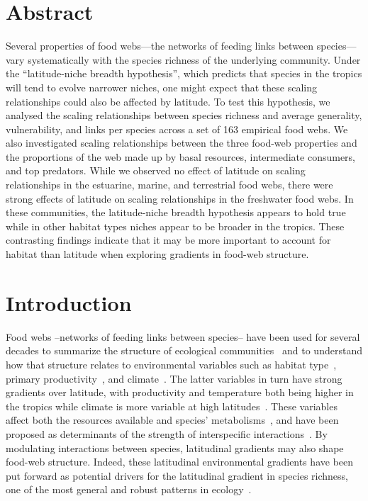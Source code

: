 \documentclass[12pt]{article}
\begin{document}
\begin{spacing}{1.0}
\section*{Abstract}

Several properties of food webs---the networks of feeding links between
species---vary systematically with the species richness of the underlying
community.  Under the ``latitude-niche breadth hypothesis'', which predicts
that species in the tropics will tend to evolve narrower niches, one might
expect that these scaling relationships could also be affected by latitude. To
test this hypothesis, we analysed the scaling relationships between species
richness and average generality, vulnerability, and links per species across a
set of 163 empirical food webs.  We also investigated scaling relationships
between the three food-web properties and the proportions of the web made up
by basal resources, intermediate consumers, and top predators. While we
observed no effect of latitude on scaling relationships in the estuarine,
marine, and terrestrial food webs, there were strong effects of latitude on
scaling relationships in the freshwater food webs. In these communities, the
latitude-niche breadth hypothesis appears to hold true while in other habitat
types niches appear to be broader in the tropics. These contrasting findings
indicate that it may be more important to account for habitat than latitude
when exploring gradients in food-web structure.


\section*{Introduction} 

  Food webs --networks of feeding links between species-- have been used for several decades to summarize the structure of 
  ecological communities~\citep{Petchey2008,Williams2000,Paine1966} and to understand how that structure relates to environmental variables 
  such as habitat type~\citep{Shurin2006,Briand1983}, primary productivity~\citep{Vermaat2009,Thompson2005a,Townsend1998}, and climate~\citep{Baiser2012,Petchey2010}. The latter
  variables in turn have strong gradients over latitude, with productivity and temperature both being higher in the tropics while 
  climate is more variable at high latitudes~\citep{Field1998}. These variables affect both the resources available and species' 
  metabolisms~\citep{Hechinger2011,White2011,OConnor2009,White2007}, and have been proposed as determinants of the strength of 
  interspecific interactions~\citep{Lang2012,Schleuning2012,Schemske2009}. 
  By modulating interactions between species, latitudinal gradients may also shape food-web structure.
  Indeed, these latitudinal environmental gradients have been put forward as potential drivers for the 
  latitudinal gradient in species richness, one of the most general and robust patterns in ecology~\citep{Schemske2009a,Macpherson2002,Kaufman1995}.


\end{spacing}
\end{document}
